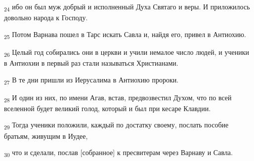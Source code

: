 \begin{tcolorbox}
\textsubscript{24} ибо он был муж добрый и исполненный Духа Святаго и веры. И приложилось довольно народа к Господу.
\end{tcolorbox}
\begin{tcolorbox}
\textsubscript{25} Потом Варнава пошел в Тарс искать Савла и, найдя его, привел в Антиохию.
\end{tcolorbox}
\begin{tcolorbox}
\textsubscript{26} Целый год собирались они в церкви и учили немалое число людей, и ученики в Антиохии в первый раз стали называться Христианами.
\end{tcolorbox}
\begin{tcolorbox}
\textsubscript{27} В те дни пришли из Иерусалима в Антиохию пророки.
\end{tcolorbox}
\begin{tcolorbox}
\textsubscript{28} И один из них, по имени Агав, встав, предвозвестил Духом, что по всей вселенной будет великий голод, который и был при кесаре Клавдии.
\end{tcolorbox}
\begin{tcolorbox}
\textsubscript{29} Тогда ученики положили, каждый по достатку своему, послать пособие братьям, живущим в Иудее,
\end{tcolorbox}
\begin{tcolorbox}
\textsubscript{30} что и сделали, послав [собранное] к пресвитерам через Варнаву и Савла.
\end{tcolorbox}

